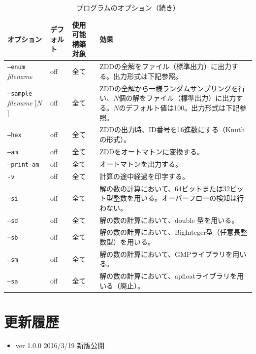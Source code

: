 \documentclass{jsarticle}
\begin{document}
\begin{table}
\caption{プログラムのオプション（続き）}
\label{tab:option3}
\begin{center}
\begin{tabular}[t]{|p{120pt}|p{50pt}|p{80pt}|p{180pt}|}
\hline%
オプション & デフォルト & 使用可能構築対象 & 効果 \\ \hline \hline
\texttt{--enum} \textit{filename} & off & 全て & ZDDの全解をファイル（標準出力）に出力する。出力形式は下記参照。 \\ \hline
\texttt{--sample} \textit{filename} [$N$] & off & 全て & ZDDの全解から一様ランダムサンプリングを行い、$N$個の解をファイル（標準出力）に出力する。$N$のデフォルト値は100。出力形式は下記参照。 \\ \hline
\texttt{--hex} & off & 全て & ZDDの出力時、ID番号を16進数にする（Knuth の形式）。 \\ \hline
\texttt{--am} & off & 全て & ZDDをオートマトンに変換する。\\ \hline
\texttt{--print-am} & off & 全て & オートマトンを出力する。 \\ \hline
\texttt{-v} & off & 全て & 計算の途中経過を印字する。\\ \hline
\texttt{--si} & off & 全て & 解の数の計算において、64ビットまたは32ビット型整数を用いる。オーバーフローの検知は行わない。\\ \hline
\texttt{--sd} & off & 全て & 解の数の計算において、double 型を用いる。\\ \hline
\texttt{--sb} & off & 全て & 解の数の計算において、BigInteger型（任意長整数型）を用いる。\\ \hline
\texttt{--sm} & off & 全て & 解の数の計算において、GMPライブラリを用いる。\\ \hline
\texttt{--sa} & off & 全て & 解の数の計算において、apfloatライブラリを用いる（廃止）。\\ \hline
\end{tabular}
\end{center}
\end{table}

\section{更新履歴}

\begin{itemize}
\item ver 1.0.0 2016/3/19 新版公開
\end{itemize}
\end{document}
